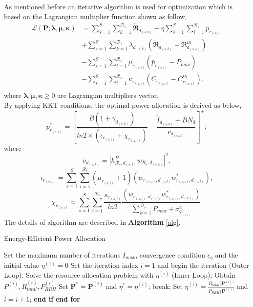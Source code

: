 \documentclass[conference,10pt,twocolumn,letter]{IEEEtran}
\begin{document}
As mentioned before an iterative algorithm is used for optimization which is based on the Lagrangian multiplier function shown as follow,
\begin{equation}
\begin{split}
\mathcal{L}(\boldsymbol{P}; \boldsymbol{\lambda}, \boldsymbol{\mu}, \boldsymbol{ \kappa}) & = \sum\limits_{s=1}^{S} \sum\limits_{k=1}^{\mathcal{D}_s}\mathfrak{\tilde{R}}_{d_{(s,k)}} 
- \eta \sum\limits_{s=1}^{S} \sum\limits_{i=1}^{\mathcal{R}_s}\bar{p}_{r_{(s,i)}}\\
&+\sum\limits_{s=1}^{S} \sum\limits_{k=1}^{\mathcal{D}_s} \lambda_{d_{(s,k)}} (\mathfrak{\tilde{R}}_{d_{(s,k)}}-\mathfrak{R}_{d_{(s,k)}}^{th})\\
&- \sum\limits_{s=1}^{S} \sum\limits_{i=1}^{\mathcal{R}_s} \mu_{r_{(s,i)}} (\bar{p}_{r_{(s,i)}}-P_{max})\\
&- \sum\limits_{s=1}^{S} \sum\limits_{i=1}^{\mathcal{R}_s} \kappa_{r_{(s,i)}} (C_{r_{(s,i)}}-C_{r_{(s,i)}}^{th}).\\
\end{split}
\end{equation}
where $\boldsymbol{\lambda}, \boldsymbol{\mu}, \boldsymbol{\kappa} \geq 0$ are Lagrangian multipliers vector.\\
By applying KKT conditions, the optimal power allocation is derived as below,
\begin{equation}
p_{r_{(s,i)}}^* =[\frac{ B(1+\gamma_{d_{(s,k)}} )}{ln2 \times (\iota_{r_{(s,i)}}+ \chi_{r_{(s,i)}})} -\frac{\tilde{I}_{d_{(s,k)}} + BN_0}{\nu_{d_{(s,k)}} }]^+;
\end{equation} 
where $$\nu_{d_{(s,k)}} =|h_{\mathcal{R}_s, d_{(s,k)}}^H w_{R_{s},d_{(s,k)}}|^2,$$
 $$\iota_{r_{(s,i)}}=\sum\limits_{s=1}^{S} \sum\limits_{i=1}^{\mathcal{R}_s} (\mu_{r_{(s,i)}}+1)(w_{r_{(s,i)},d_{(v,l)}} w_{r_{(s,i)},d_{(v,l)}}^*),$$
 $$\chi_{r_{(s,i)}} \approx  \sum\limits_{s=1}^{S} \sum\limits_{i=1}^{\mathcal{R}_s} \frac{\kappa_{r_{(s,i)}}}{ln2}\frac{(w_{r_{(s,i)},d_{(v,l)}} w_{r_{(s,i)},d_{(v,l)}}^*)}{ \sum\limits_{k=1}^{\mathcal{D}_s}P_{max}+\sigma_{q_{r_{(s,i)}}}^2}.$$
  The details of algorithm are described in \textbf{Algorithm} \eqref{alg}.  
\begin{algorithm}
\caption{Energy-Efficient Power Allocation}\label{alg}
\begin{algorithmic}[1]
\State Set the maximum number of iterations $I_{max}$, convergence condition $\epsilon_{\eta}$  and the initial value $\eta^{(1)} = 0$
\State Set the iteration index $i = 1$ and begin the iteration (Outer
Loop).
\State Solve the resource allocation problem with $\eta^{(i)}$ (Inner Loop);
\State Obtain $P^{(i)}, R_{total}^{(i)}, P_{RRH}^{(i)}$
\State Set $\boldsymbol{P}^*= \boldsymbol{P}^{(i)} $   and  $ \eta^{*} =\eta^{(i)} $;
\State break;
\Else
\State Set $\eta^{(i)}= \frac{R_{total}(\boldsymbol{P}^{(i))}}{P_{RRH}(\boldsymbol{P}^{(i))}}$ and $i= i+1$;
\EndIf 
\State \textbf{end if}
\EndFor 
\State \textbf{end for}
\end{algorithmic}
\end{algorithm}
\end{document}
